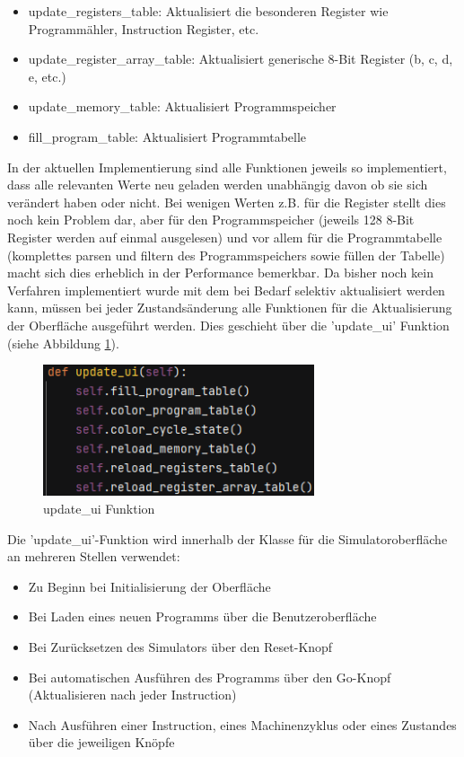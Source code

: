 \documentclass[12pt]{article}
\newcommand{\imgSpaceBefore}{\vspace{10pt}}
\begin{document}
\begin{itemize}
	\item update\_registers\_table: Aktualisiert die besonderen Register wie Programmähler, Instruction Register, etc.
	\item update\_register\_array\_table: Aktualisiert generische 8-Bit Register (b, c, d, e, etc.)
	\item update\_memory\_table: Aktualisiert Programmspeicher
	\item fill\_program\_table: Aktualisiert Programmtabelle
\end{itemize}
\noindent
In der aktuellen Implementierung sind alle Funktionen jeweils so implementiert, dass alle relevanten Werte neu geladen werden unabhängig davon ob sie sich verändert haben oder nicht. Bei wenigen Werten z.B. für die Register stellt dies noch kein Problem dar, aber für den Programmspeicher (jeweils 128 8-Bit Register werden auf einmal ausgelesen) und vor allem für die Programmtabelle (komplettes parsen und filtern des Programmspeichers sowie füllen der Tabelle) macht sich dies erheblich in der Performance bemerkbar. Da bisher noch kein Verfahren implementiert wurde mit dem bei Bedarf selektiv aktualisiert werden kann, müssen bei jeder Zustandsänderung alle Funktionen für die Aktualisierung der Oberfläche ausgeführt werden. Dies geschieht über die 'update\_ui' Funktion (siehe Abbildung \ref{fig:updateUI}).\imgSpaceBefore

\begin{figure}[H]
\centering
\includegraphics[width=8cm]{bilder/updateUI}
\caption{update\_ui Funktion}
\label{fig:updateUI}
\end{figure}

\noindent
Die 'update\_ui'-Funktion wird innerhalb der Klasse für die Simulatoroberfläche an mehreren Stellen verwendet:\imgSpaceBefore

\begin{itemize}
	\item Zu Beginn bei Initialisierung der Oberfläche
	\item Bei Laden eines neuen Programms über die Benutzeroberfläche
	\item Bei Zurücksetzen des Simulators über den Reset-Knopf
	\item Bei automatischen Ausführen des Programms über den Go-Knopf (Aktualisieren nach jeder Instruction)
	\item Nach Ausführen einer Instruction, eines Machinenzyklus oder eines Zustandes über die jeweiligen Knöpfe
\end{itemize}
\end{document}

